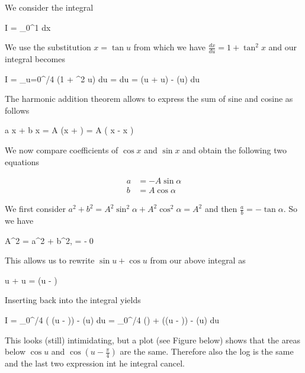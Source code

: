 
We consider the integral

\bee
I = \int_0^1  dx
\eee

We use the substitution $x = \tan u$ from which we have $\frac{dx}{du}=1 + \tan^2 x$ and our integral becomes

\bee
I = \int_{u=0}^{\pi/4}  (1 + \tan^2 u) du = \int \ln {} du = \int \ln (\sin u + \cos u) - \ln (\cos u) du
\eee

The harmonic addition theorem allows to express the sum of sine and cosine as follows

\bee
a \sin x + b \cos x = A \cos(x + \alpha) = A \left( \cos x \cos \alpha - \sin x \sin \alpha \right)
\eee

We now compare coefficients of $\cos x $ and $\sin x$ and obtain the following two equations

\begin{align*}
  a &= -A \sin \alpha \\
  b &= A \cos \alpha
\end{align*}

We first consider $a^2 + b^2 = A^2 \sin^2 \alpha + A^2 \cos^2 \alpha = A^2$ and then $\frac{a}{b} = -\tan \alpha$. So we have

\bee
A^2 = a^2 + b^2, \quad {} = -\tan \alpha \qed
\eee

This allows us to rewrite $\sin u + \cos u$ from our above integral as

\bee
\sin u + \cos u =  \cos \left(u -  \right)
\eee

Inserting back into the integral yields

\bee
I = \int_0^{\pi/4} \ln \left( \cos \left(u -  \right)\right) - \ln(\cos u) du = \int_0^{\pi/4} \ln () + \ln \left(\cos \left(u -  \right)\right) - \ln(\cos u) du
\eee

This looks (still) intimidating, but a plot (see Figure below) shows that the areas below $\cos u$ and $\cos \left(u - \frac{\pi}{4} \right)$ are the same. Therefore also the log is the same and the last two expression int he integral cancel.

